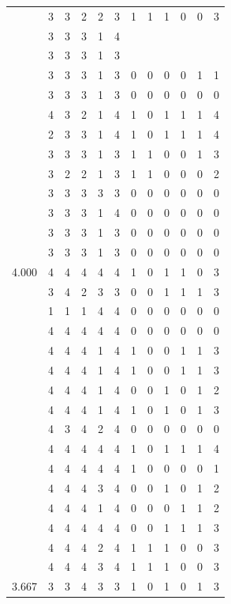 \documentclass[]{book}
\theoremstyle{definition}
\theoremstyle{definition}
\theoremstyle{definition}
\theoremstyle{remark}
\begin{document}
\begin{table}
{\begin{tabular}[t]{rrrrrrrrrrrr}
 & 3 & 3 & 2 & 2 & 3 & 1 & 1 & 1 & 0 & 0 & 3\\
 & 3 & 3 & 3 & 1 & 4 &  &  &  &  &  & \\
 & 3 & 3 & 3 & 1 & 3 &  &  &  &  &  & \\
 & 3 & 3 & 3 & 1 & 3 & 0 & 0 & 0 & 0 & 1 & 1\\
 & 3 & 3 & 3 & 1 & 3 & 0 & 0 & 0 & 0 & 0 & 0\\
 & 4 & 3 & 2 & 1 & 4 & 1 & 0 & 1 & 1 & 1 & 4\\
 & 2 & 3 & 3 & 1 & 4 & 1 & 0 & 1 & 1 & 1 & 4\\
 & 3 & 3 & 3 & 1 & 3 & 1 & 1 & 0 & 0 & 1 & 3\\
 & 3 & 2 & 2 & 1 & 3 & 1 & 1 & 0 & 0 & 0 & 2\\
 & 3 & 3 & 3 & 3 & 3 & 0 & 0 & 0 & 0 & 0 & 0\\
 & 3 & 3 & 3 & 1 & 4 & 0 & 0 & 0 & 0 & 0 & 0\\
 & 3 & 3 & 3 & 1 & 3 & 0 & 0 & 0 & 0 & 0 & 0\\
 & 3 & 3 & 3 & 1 & 3 & 0 & 0 & 0 & 0 & 0 & 0\\
4.000 & 4 & 4 & 4 & 4 & 4 & 1 & 0 & 1 & 1 & 0 & 3\\
 & 3 & 4 & 2 & 3 & 3 & 0 & 0 & 1 & 1 & 1 & 3\\
 & 1 & 1 & 1 & 4 & 4 & 0 & 0 & 0 & 0 & 0 & 0\\
 & 4 & 4 & 4 & 4 & 4 & 0 & 0 & 0 & 0 & 0 & 0\\
 & 4 & 4 & 4 & 1 & 4 & 1 & 0 & 0 & 1 & 1 & 3\\
 & 4 & 4 & 4 & 1 & 4 & 1 & 0 & 0 & 1 & 1 & 3\\
 & 4 & 4 & 4 & 1 & 4 & 0 & 0 & 1 & 0 & 1 & 2\\
 & 4 & 4 & 4 & 1 & 4 & 1 & 0 & 1 & 0 & 1 & 3\\
 & 4 & 3 & 4 & 2 & 4 & 0 & 0 & 0 & 0 & 0 & 0\\
 & 4 & 4 & 4 & 4 & 4 & 1 & 0 & 1 & 1 & 1 & 4\\
 & 4 & 4 & 4 & 4 & 4 & 1 & 0 & 0 & 0 & 0 & 1\\
 & 4 & 4 & 4 & 3 & 4 & 0 & 0 & 1 & 0 & 1 & 2\\
 & 4 & 4 & 4 & 1 & 4 & 0 & 0 & 0 & 1 & 1 & 2\\
 & 4 & 4 & 4 & 4 & 4 & 0 & 0 & 1 & 1 & 1 & 3\\
 & 4 & 4 & 4 & 2 & 4 & 1 & 1 & 1 & 0 & 0 & 3\\
 & 4 & 4 & 4 & 3 & 4 & 1 & 1 & 1 & 0 & 0 & 3\\
3.667 & 3 & 3 & 4 & 3 & 3 & 1 & 0 & 1 & 0 & 1 & 3\\

\end{tabular}}
\end{table}
\end{document}
